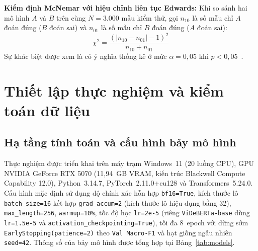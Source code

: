 \documentclass[journal,a4paper]{IEEEtran}
\newcommand{\code}[1]{\texttt{\small #1}}
\begin{document}
\textbf{Kiểm định McNemar với hiệu chỉnh liên tục Edwards:} Khi so sánh hai mô hình $A$ và $B$ trên cùng $N = 3.000$ mẫu kiểm thử, gọi $n_{10}$ là số mẫu chỉ $A$ đoán đúng ($B$ đoán sai) và $n_{01}$ là số mẫu chỉ $B$ đoán đúng ($A$ đoán sai):
\begin{equation}
  \chi^2 = \frac{(|n_{10} - n_{01}| - 1)^2}{n_{10} + n_{01}}
  \label{eq:mcnemar}
\end{equation}
Sự khác biệt được xem là có ý nghĩa thống kê ở mức $\alpha = 0{,}05$ khi $p < 0{,}05$~\cite{mcnemar1947note}.

\section{Thiết lập thực nghiệm và kiểm toán dữ liệu}
\label{sec:setup}

\subsection{Hạ tầng tính toán và cấu hình bảy mô hình}

Thực nghiệm được triển khai trên máy trạm Windows~11 (20 luồng CPU), GPU NVIDIA GeForce RTX 5070 (11,94~GB VRAM, kiến trúc Blackwell Compute Capability 12.0), Python~3.14.7, PyTorch~2.11.0+cu128 và Transformers~5.24.0. Cấu hình mặc định sử dụng độ chính xác hỗn hợp \code{bf16=True}, kích thước lô \code{batch\_size=16} kết hợp \code{grad\_accum=2} (kích thước lô hiệu dụng bằng 32), \code{max\_length=256}, \code{warmup=10\%}, tốc độ học \code{lr=2e-5} (riêng \code{ViDeBERTa-base} dùng \code{lr=1.5e-5} và \code{activation\_checkpointing=True}), tối đa 8~epoch với dừng sớm \code{EarlyStopping(patience=2)} theo \code{Val Macro-F1} và hạt giống ngẫu nhiên \code{seed=42}. Thông số của bảy mô hình được tổng hợp tại Bảng~\ref{tab:models}.
\end{document}
